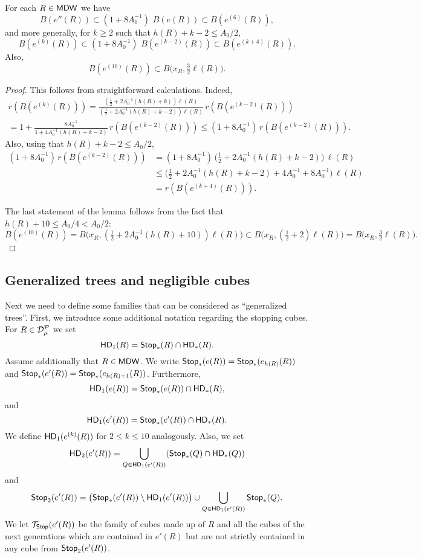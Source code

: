 \vv


\begin{lemma}\label{lem-calcf}
For each $R\in{\mathsf{MDW}}$  we have
$$B(e''(R)) \subset (1+8A_0^{-1})\,\,B(e(R)) \subset B(e^{(6)}(R)),$$
and more generally, for $k\geq 2$ such that $h(R)+k-2\leq A_0/2$,
$$B(e^{(k)}(R)) \subset (1+8A_0^{-1})\,\,B(e^{(k-2)}(R)) \subset B(e^{(k+4)}(R)).$$
Also,
$$B(e^{(10)}(R))\subset B\big(x_R,\tfrac32 \ell(R)\big).$$
\end{lemma}

\begin{proof}
This follows from straightforward calculations. 
Indeed,
\begin{multline*}
r(B(e^{(k)}(R)))  = \frac{(\tfrac12 + 2A_0^{-1}(h(R)+k))\ell(R)}{(\tfrac12 + 2A_0^{-1}(h(R)+k-2))\ell(R)}
\,r(B(e^{(k-2)}(R)))\\
 = 1 + \frac{8A_0^{-1}}{1 + 4A_0^{-1}(h(R)+k-2)}\,r(B(e^{(k-2)}(R)))\leq (1+8A_0^{-1})\,r(B(e^{(k-2)}(R))).
\end{multline*}
Also, using that $h(R)+k-2\leq A_0/2$,
\begin{align*}
(1+8A_0^{-1})\,r(B(e^{(k-2)}(R))) & = (1+8A_0^{-1})\,\big(\tfrac12 + 2A_0^{-1}(h(R)+k-2)\big)\,\ell(R)\\
& \leq \big(\tfrac12 + 2A_0^{-1}(h(R)+k-2) + 4A_0^{-1} + 8A_0^{-1}
\big)\,\ell(R)\\
& =
r(B(e^{(k+4)}(R))).
\end{align*}

The last statement of the lemma follows from the fact that $h(R)+10\leq A_0/4<A_0/2$:
$$
B(e^{(10)}(R)) = B\big(x_R,(\tfrac12 + 2A_0^{-1}(h(R)+10))\ell(R)\big) \subset
B\big(x_R,(\tfrac12 + 2)\ell(R)\big) = B\big(x_R,\tfrac32 \ell(R)\big).$$
\end{proof}
\vv

\subsection{Generalized trees and negligible cubes}\label{subsec:generalized}

Next we need to define some families that can be considered as ``generalized trees''. First, we introduce some additional notation regarding the stopping cubes. For $R\in{\mathcal D}_{\mu}^{\mathcal P}$ we set
$${\mathsf{HD}}_{1}(R) = {\mathsf {Stop}}_*(R)\cap {\mathsf{HD}}_*(R).$$ 
Assume additionally that $R\in{\mathsf{MDW}}$. We write ${\mathsf {Stop}}_*(e(R))={\mathsf {Stop}}_*(e_{h(R)}(R))$ and ${\mathsf {Stop}}_*(e'(R))={\mathsf {Stop}}_*(e_{h(R)+1}(R))$. Furthermore,
$${\mathsf{HD}}_1(e(R)) = {\mathsf {Stop}}_*(e(R))\cap {\mathsf{HD}}_*(R),$$
and
$${\mathsf{HD}}_{1}(e'(R)) = {\mathsf {Stop}}_*(e'(R))\cap {\mathsf{HD}}_*(R).$$
We define ${\mathsf{HD}}_{1}(e^{(k)}(R))$ for $2\le k\le 10$ analogously. Also, we set 
$${\mathsf{HD}}_2(e'(R)) = \bigcup_{Q\in {\mathsf{HD}}_1(e'(R))} ({\mathsf {Stop}}_*(Q)\cap {\mathsf{HD}}_*(Q))$$
and
\begin{equation}\label{eqstop2}
{\mathsf {Stop}}_2(e'(R)) = \big({\mathsf {Stop}}_*(e'(R)) \setminus {\mathsf{HD}}_1(e'(R))\big) \cup \bigcup_{Q\in {\mathsf{HD}}_1(e'(R))} {\mathsf {Stop}}_*(Q).
\end{equation}
We let ${\mathcal T}_{\mathsf {Stop}}(e'(R))$ be the family of cubes made up of $R$ and all the cubes of the next generations which are contained in $e'(R)$ but are not 
strictly contained in any cube from ${\mathsf {Stop}}_2(e'(R))$.

